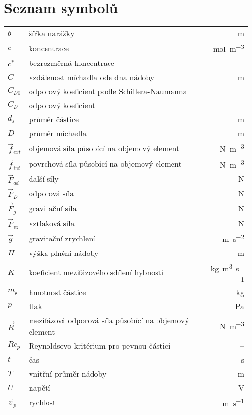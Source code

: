 \chapter*{Seznam symbolů}

\renewcommand\arraystretch{1.5}
\begin{tabularx}{\textwidth}{@{}p{1.0cm} X r@{}}
	$b$ & šířka narážky & \si{\meter} \\
	$c$ & koncentrace & \si{\mole\per\cubic\meter} \\
	$c^{*}$ & bezrozměrná koncentrace & --\\
	$C$ & vzdálenost míchadla ode dna nádoby & \si{\meter} \\
	$C_{D0}$ & odporový koeficient podle Schillera-Naumanna & -- \\ 
	$C_{D}$ & odporový koeficient &  -- \\
	$d_{s}$ & průměr částice & \si{\meter} \\
	$D$ & průměr míchadla & \si{\meter} \\
	
	$\vec{f}_{ext}$ & objemová síla působící na objemový element & \si{\newton\per\cubic\meter} \\
	$\vec{f}_{int}$ & povrchová síla působící na objemový element & \si{\newton\per\cubic\meter} \\
	$\vec{F}_{ad}$ & další síly & \si{\newton} \\
	$\vec{F}_{D}$ & odporová síla & \si{\newton} \\
	$\vec{F}_{g}$ & gravitační síla & \si{\newton} \\
	$\vec{F}_{vz}$ & vztlaková síla & \si{\newton} \\
	$\vec{g}$ & gravitační zrychlení & \si{\meter\per\second\squared} \\
	$H$ & výška plnění nádoby & \si{\meter} \\
	$K$ & koeficient mezifázového sdílení hybnosti & \si{\kilogram\per\cubic\meter\per\second} \\
	$m_{p}$ & hmotnost částice & \si{\kilogram} \\
	
	$p$ & tlak & \si{\pascal} \\
	$\vec{R}$ & mezifázová odporová síla působící na objemový element & \si{\newton\per\cubic\meter} \\
	$Re_{p}$ & Reynoldsovo kritérium pro pevnou částici &  --\\
	$t$ & čas & \si{\second} \\
	$T$ & vnitřní průměr nádoby & \si{\meter} \\
	$U$ & napětí & \si{\volt} \\
	$\vec{v}_{p}$ & rychlost & \si{\meter\per\second} \\
\end{tabularx}


